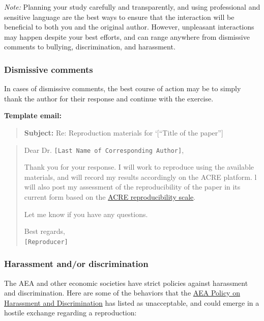 \documentclass[]{book}
\begin{document}
\emph{Note:} Planning your study carefully and transparently, and using professional and sensitive language are the best ways to ensure that the interaction will be beneficial to both you and the original author. However, unpleasant interactions may happen despite your best efforts, and can range anywhere from dismissive comments to bullying, discrimination, and harassment.

\hypertarget{dismissive-comments}{%
\subsubsection{Dismissive comments}\label{dismissive-comments}}

In cases of dismissive comments, the best course of action may be to simply thank the author for their response and continue with the exercise.

\textbf{Template email:}

\begin{quote}
\textbf{Subject:} Re: Reproduction materials for `{[}``Title of the paper''{]}
\end{quote}

\begin{quote}
Dear Dr. \texttt{{[}Last\ Name\ of\ Corresponding\ Author{]}},

Thank you for your response. I will work to reproduce using the available materials, and will record my results accordingly on the ACRE platform. l will also post my assessment of the reproducibility of the paper in its current form based on the \href{https://bitss.github.io/ACRE/assessment.html\#levels-of-computational-reproducibility-for-a-specific-output}{ACRE reproducibility scale}.

Let me know if you have any questions.

Best regards,\\
\texttt{{[}Reproducer{]}}
\end{quote}

\hypertarget{harassment-andor-discrimination}{%
\subsubsection{Harassment and/or discrimination}\label{harassment-andor-discrimination}}

The AEA and other economic societies have strict policies against harassment and discrimination. Here are some of the behaviors that the \href{https://www.aeaweb.org/about-aea/aea-policy-harassment-discrimination}{AEA Policy on Harassment and Discrimination} has listed as unacceptable, and could emerge in a hostile exchange regarding a reproduction:
\end{document}
